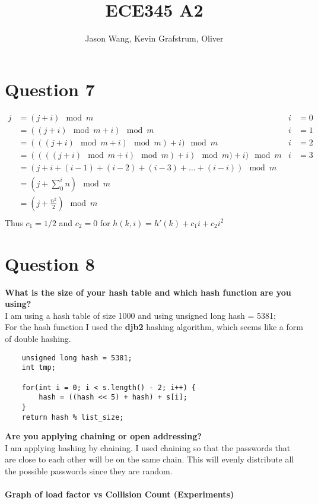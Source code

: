 \documentclass[]{article}
\title{ECE345 A2}
\author{Jason Wang, Kevin Grafstrum, Oliver}
\begin{document}
\maketitle

\section*{Question 7}
	\begin{align*}
		j &= (j+i)\mod m & i &= 0\\
		&= ((j+i)\mod m + i)\mod m & i &= 1\\
		&= (((j+i)\mod m + i)\mod m) + i)\mod m & i &= 2\\
		&= ((((j+i)\mod m + i)\mod m) + i)\mod m) + i)\mod m & i &= 3\\
		&= (j + i + (i-1) + (i-2) + (i-3) + \dots + (i-i))\mod m\\
		&= (j + \sum_{0}^{i}n)\mod m\\
		&= (j + \frac{n^2}{2})\mod m\\
	\end{align*}
	Thus $c_1 = 1/2$ and $c_2 = 0$ for $h(k,i) = h'(k) + c_1i + c_2i^2$

\section*{Question 8}
	\textbf{What is the size of your hash table and which hash function are you using?}\\
	I am using a hash table of size 1000 and using unsigned long hash = 5381;\\
	For the hash function I used the \textbf{djb2} hashing algorithm, which seems like a form of double hashing.\\
	\begin{lstlisting}
	unsigned long hash = 5381;
	int tmp;
	
	for(int i = 0; i < s.length() - 2; i++) {
		hash = ((hash << 5) + hash) + s[i];
	}
	return hash % list_size;
	\end{lstlisting}
	\textbf{Are you applying chaining or open addressing?} \\
	I am applying hashing by chaining. I used chaining so that the passwords that are close to each other will be on the same chain. This will evenly distribute all the possible passwords since they are random.\\\\
	\textbf{Graph of load factor vs Collision Count (Experiments)}\\
	
\end{document}

